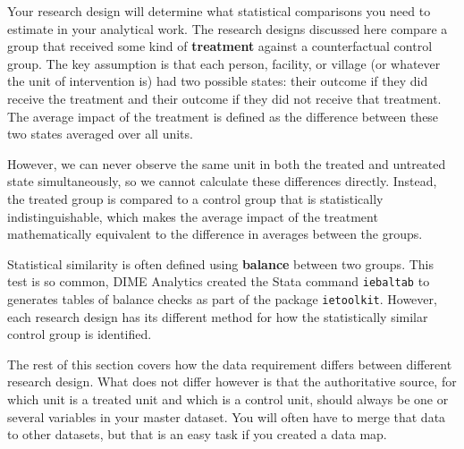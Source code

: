 Your research design will determine what statistical comparisons you need
to estimate in your analytical work.
The research designs discussed here compare a group that received
some kind of \textbf{treatment}
against a counterfactual control group.
The key assumption is that each
person, facility, or village (or whatever the unit of intervention is)
had two possible states: their outcome if they did receive the treatment
and their outcome if they did not receive that treatment.
The average impact of the treatment is defined as
the difference between these two states averaged over all units.

However, we can never observe the same unit
in both the treated and untreated state simultaneously,
so we cannot calculate these differences directly.
Instead, the treated group is compared to a control group
that is statistically indistinguishable,
which makes the average impact of the treatment
mathematically equivalent to the difference in averages between the groups.

Statistical similarity is often defined using \textbf{balance} between two groups.	
This test is so common,	
DIME Analytics created the Stata command \texttt{iebaltab}	
to generates tables of balance checks	
as part of the package \texttt{ietoolkit}.	
However, each research design has its different method	
for how the statistically similar control group is identified.

The rest of this section covers how the data requirement differs between different research design.
What does not differ however is that the authoritative source,
for which unit is a treated unit and which is a control unit,
should always be one or several variables in your master dataset. 
You will often have to merge that data to other datasets, 
but that is an easy task if you created a data map.


